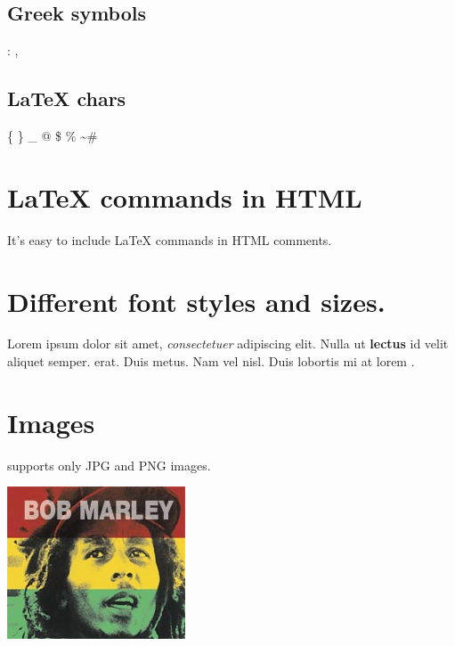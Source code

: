 \documentclass{article}
\begin{document}
\subsection{Greek symbols}

\par
{}
: \Alpha  , \Gamma \Theta \Xi \Pi 
\subsection{LaTeX chars}

\par
\{ \} \_ \hat{} @ \$  \% \sim \#
\section{LaTeX commands in HTML}

\par

It's easy to include LaTeX commands in HTML comments.

\section{Different font styles and sizes.}

\par
Lorem ipsum {\fontsize{7}{8}\selectfont dolor}
 sit amet, \textit{consectetuer}
 adipiscing elit.
 Nulla ut \textbf{lectus}
 id velit aliquet semper. 
 erat. Duis metus. Nam
 vel nisl. Duis {\fontsize{4}{5}\selectfont lobortis}
 mi at {\fontsize{1}{1}\selectfont lorem}
.
\href{}{}

\section{Images}

\par

 supports only JPG and PNG images.
\par

\begin{center}
\includegraphics{marley.jpg}


\end{center}
\end{document}
